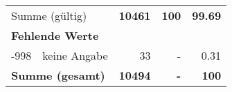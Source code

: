 \begin{longtable}{lXrrr}
     \midrule
     \multicolumn{2}{l}{Summe (gültig)} &
       \textbf{\num{10461}} &
     \textbf{\num{100}} &
       \textbf{\num[round-mode=places,round-precision=2]{99.69}} \\
     \multicolumn{5}{l}{\textbf{Fehlende Werte}}\\
       -998 &
       keine Angabe &
         \num{33} &
        - &
         \num[round-mode=places,round-precision=2]{0.31} \\
     \midrule
     \multicolumn{2}{l}{\textbf{Summe (gesamt)}} &
          \textbf{\num{10494}} &
        \textbf{-} &
        \textbf{\num{100}} \\
     \bottomrule
     \end{longtable}
     
